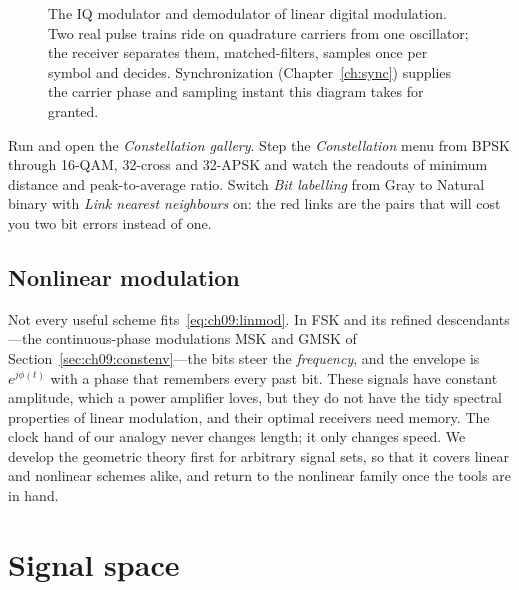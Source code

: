 \begin{figure}[htbp]
\caption{The IQ modulator and demodulator of linear digital modulation. Two real pulse trains
ride on quadrature carriers from one oscillator; the receiver separates them, matched-filters,
samples once per symbol and decides. Synchronization (Chapter~\ref{ch:sync}) supplies the
carrier phase and sampling instant this diagram takes for granted.}
\label{fig:ch09_iq}
\end{figure}

\begin{tryit}
Run  and open the \emph{Constellation gallery}. Step the
\emph{Constellation} menu from BPSK through 16-QAM, 32-cross and 32-APSK and watch the readouts
of minimum distance and peak-to-average ratio. Switch \emph{Bit labelling} from Gray to Natural
binary with \emph{Link nearest neighbours} on: the red links are the pairs that will cost you two
bit errors instead of one.
\end{tryit}

\subsection{Nonlinear modulation}

Not every useful scheme fits~\eqref{eq:ch09:linmod}. In FSK and its refined descendants---the
continuous-phase modulations MSK and GMSK of Section~\ref{sec:ch09:constenv}---the bits steer the
\emph{frequency}, and the envelope is $e^{j\phi(t)}$ with a phase that remembers every past bit.
These signals have constant amplitude, which a power amplifier loves, but they do not have the
tidy spectral properties of linear modulation, and their optimal receivers need memory. The clock
hand of our analogy never changes length; it only changes speed. We develop the geometric theory
first for arbitrary signal sets, so that it covers linear and nonlinear schemes alike, and return
to the nonlinear family once the tools are in hand.

\section{Signal space}
\label{sec:ch09:signalspace}

